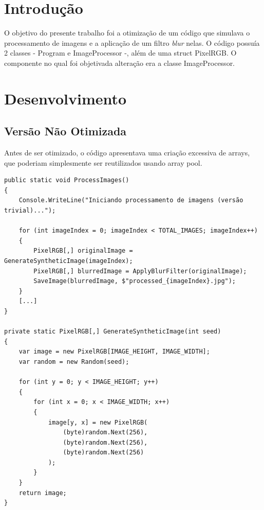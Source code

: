 \documentclass[
	12pt,				%
	oneside,			%
	a4paper,			%
	english,			%
	brazil,				%
	]{abntex2}
\begin{document}
\frenchspacing 

\imprimircapa

{
\ABNTEXchapterfont

\textual

\section{Introdução}

O objetivo do presente trabalho foi a otimização de um código que simulava o processamento de imagens e a aplicação de um filtro \textit{blur} nelas. O código possuía 2 classes - Program e ImageProcessor -, além de uma struct PixelRGB. O componente no qual foi objetivada alteração era a classe ImageProcessor.

\section{Desenvolvimento}

\subsection{Versão Não Otimizada}
Antes de ser otimizado, o código apresentava uma criação excessiva de arrays, que poderiam simplesmente ser reutilizados usando array pool.

\begin{lstlisting}
public static void ProcessImages()
{
    Console.WriteLine("Iniciando processamento de imagens (versão trivial)...");
    
    for (int imageIndex = 0; imageIndex < TOTAL_IMAGES; imageIndex++)
    {
        PixelRGB[,] originalImage = GenerateSyntheticImage(imageIndex);
        PixelRGB[,] blurredImage = ApplyBlurFilter(originalImage);
        SaveImage(blurredImage, $"processed_{imageIndex}.jpg");
    }
    [...]
}

private static PixelRGB[,] GenerateSyntheticImage(int seed)
{
    var image = new PixelRGB[IMAGE_HEIGHT, IMAGE_WIDTH];
    var random = new Random(seed);
    
    for (int y = 0; y < IMAGE_HEIGHT; y++)
    {
        for (int x = 0; x < IMAGE_WIDTH; x++)
        {
            image[y, x] = new PixelRGB(
                (byte)random.Next(256),
                (byte)random.Next(256),
                (byte)random.Next(256)
            );
        }
    }
    return image;
}


\end{lstlisting}}
\end{document}
